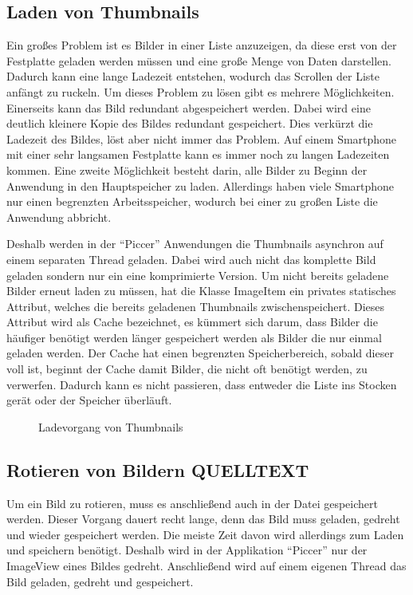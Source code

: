 \subsection{Laden von Thumbnails}
Ein großes Problem ist es Bilder in einer Liste anzuzeigen,
da diese erst von der Festplatte geladen werden müssen und eine große Menge von Daten darstellen.
Dadurch kann eine lange Ladezeit entstehen,
wodurch das Scrollen der Liste anfängt zu ruckeln.
Um dieses Problem zu lösen gibt es mehrere Möglichkeiten.
Einerseits kann das Bild redundant abgespeichert werden.
Dabei wird eine deutlich kleinere Kopie des Bildes redundant gespeichert.
Dies verkürzt die Ladezeit des Bildes, löst aber nicht immer das Problem.
Auf einem Smartphone mit einer sehr langsamen Festplatte kann es immer noch zu langen Ladezeiten kommen.
Eine zweite Möglichkeit besteht darin, alle Bilder zu Beginn der Anwendung in den Hauptspeicher zu laden.
Allerdings haben viele Smartphone nur einen begrenzten Arbeitsspeicher, wodurch bei einer 
zu großen Liste die Anwendung abbricht.

Deshalb werden in der \enquote{Piccer} Anwendungen die Thumbnails asynchron auf einem separaten Thread geladen.
Dabei wird auch nicht das komplette Bild geladen sondern nur ein eine komprimierte Version.
Um nicht bereits geladene Bilder erneut laden zu müssen,
hat die Klasse ImageItem ein privates statisches Attribut, welches die bereits geladenen Thumbnails zwischenspeichert.
Dieses Attribut wird als Cache bezeichnet, es kümmert sich darum, dass Bilder die häufiger 
benötigt werden länger gespeichert werden als Bilder die nur einmal geladen werden.
Der Cache hat einen begrenzten Speicherbereich, sobald dieser voll ist, beginnt der Cache
damit Bilder, die nicht oft benötigt werden, zu verwerfen.
Dadurch kann es nicht passieren, dass entweder die Liste ins Stocken gerät oder der Speicher überläuft.

\begin{figure}[H]
\label{loadThumbnails}
\centering
{}
\caption{Ladevorgang von Thumbnails}
\end{figure}

\subsection{Rotieren von Bildern QUELLTEXT}
Um ein Bild zu rotieren, muss es anschließend auch in der Datei gespeichert werden.
Dieser Vorgang dauert recht lange, denn das Bild muss geladen, gedreht und wieder gespeichert werden.
Die meiste Zeit davon wird allerdings zum Laden und speichern benötigt.
Deshalb wird in der Applikation \enquote{Piccer} nur der ImageView eines Bildes gedreht.
Anschließend wird auf einem eigenen Thread das Bild geladen, gedreht und gespeichert.